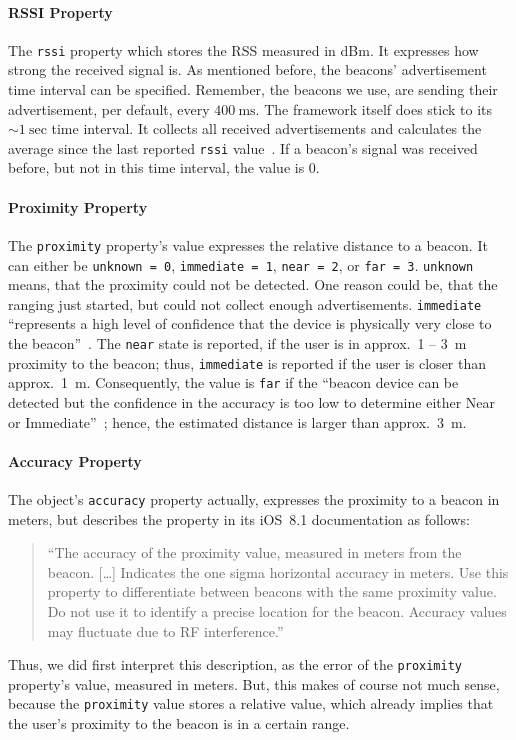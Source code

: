 \paragraph{\acs{RSSI} Property} The \texttt{rssi} property which stores the \acl{RSS} measured in dBm. It expresses how strong the received signal is. As mentioned before, the beacons' advertisement time interval can be specified. Remember, the beacons we use, are sending their advertisement, per default, every $400~\text{ms}$. The framework itself does stick to its $\sim 1~\text{sec}$ time interval. It collects all received advertisements and calculates the  average since the last reported \texttt{rssi} value~\citep{apple:ios_doc_cl}. If a beacon's signal was received before, but not in this time interval, the value is 0.

\paragraph{Proximity Property} The \texttt{proximity} property's value expresses the relative distance to a beacon. It can either be \texttt{unknown = 0}, \texttt{immediate = 1}, \texttt{near = 2}, or \texttt{far = 3}. \texttt{unknown} means, that the proximity could not be detected. One reason could be, that the ranging just started, but could not collect enough advertisements. \texttt{immediate} ``represents a high level of confidence that the device is physically very close to the beacon''~\citep{apple:getting_started}. The \texttt{near} state is reported, if the user is in approx.\ 1 -- 3~m proximity to the beacon; thus, \texttt{immediate} is reported if the user is closer than approx.\ 1~m. Consequently, the value is \texttt{far} if the ``beacon device can be detected but the confidence in the accuracy is too low to determine either Near or Immediate''~\citep{apple:getting_started}; hence, the estimated distance is larger than approx.\ 3~m.

\paragraph{Accuracy Property} The object's \texttt{accuracy} property actually, expresses the proximity to a beacon in meters, but \citet{apple:ios_doc_cl} describes the property in its iOS~8.1 documentation as follows:
\begin{quote}
  ``The accuracy of the proximity value, measured in meters from the beacon.
  [\dots]
  Indicates the one sigma horizontal accuracy in meters. Use this property to differentiate between beacons with the same proximity value. Do not use it to identify a precise location for the beacon. Accuracy values may fluctuate due to RF interference.''\citep{apple:ios_doc_cl}
\end{quote}
Thus, we did first interpret this description, as the error of the \texttt{proximity} property's value, measured in meters. But, this makes of course not much sense, because the \texttt{proximity} value stores a relative value, which already implies that the user's proximity to the beacon is in a certain range.

